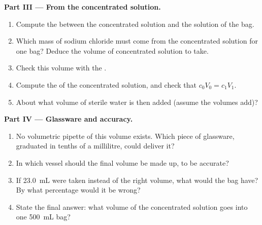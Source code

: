 \begin{problem}
\medskip
\noindent\textbf{Part III --- From the concentrated solution.}
\begin{enumerate}[resume]
  \item Compute the  between the concentrated solution and
        the solution of the bag.
  \item Which mass of sodium chloride must come from the concentrated
        solution for one bag? Deduce the volume of concentrated solution
        to take.
  \item Check this volume with the .
  \item Compute the  of the concentrated solution, and
        check that $c_0 V_0 = c_1 V_1$.
  \item About what volume of sterile water is then added (assume the
        volumes add)?
\end{enumerate}

\medskip
\noindent\textbf{Part IV --- Glassware and accuracy.}
\begin{enumerate}[resume]
  \item No volumetric pipette of this volume exists. Which piece of
        glassware, graduated in tenths of a millilitre, could deliver
        it?
  \item In which vessel should the final volume be made up, to be
        accurate?
  \item If \qty{23.0}{mL} were taken instead of the right volume, what
         would the bag have? By what percentage would
        it be wrong?
  \item State the final answer: what volume of the concentrated
        solution goes into one \qty{500}{mL} bag?
\end{enumerate}
\end{problem}
